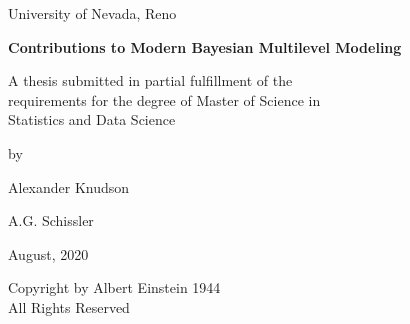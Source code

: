 \documentclass[11pt, oneside, openany]{scrbook}
\begin{document}
\begin{titlepage}
\begin{center}
\vspace*{1in}
University of Nevada, Reno

\vspace{1.5in}
\textbf{Contributions to Modern Bayesian Multilevel Modeling}

\vspace{1in}
A thesis submitted in partial fulfillment of the \\
requirements for the degree of Master of Science in \\
Statistics and Data Science

\vspace{1in}
by

\vspace{1em}
Alexander Knudson

\vspace{2em}
A.G. Schissler

\vspace{3em}
August, 2020

\end{center}
\end{titlepage}
\thispagestyle{empty}
\begin{center}
\vspace*{\fill}
Copyright by Albert Einstein 1944 \\
All Rights Reserved
\vspace*{\fill}
\end{center}
\end{document}
